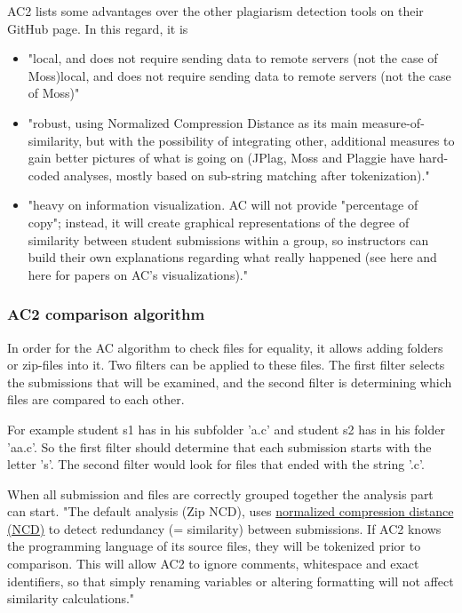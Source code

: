 \documentclass[a4paper, 11pt]{article}
\renewcommand{\\}{\vspace*{0.5\baselineskip} \newline}
\begin{document}
AC2 lists some advantages over the other plagiarism detection tools on their GitHub page. In this regard, it is

\begin{itemize}
	\item "local, and does not require sending data to remote servers (not the case of Moss)local, and does not require sending data to remote servers (not the case of Moss)"
	\item "robust, using Normalized Compression Distance as its main measure-of-similarity, but with the possibility of integrating other, additional measures to gain better pictures of what is going on (JPlag, Moss and Plaggie have hard-coded analyses, mostly based on sub-string matching after tokenization)."
	\item "heavy on information visualization. AC will not provide "percentage of copy"; instead, it will create graphical representations of the degree of similarity between student submissions within a group, so instructors can build their own explanations regarding what really happened (see here and here for papers on AC's visualizations)."
\end{itemize}\autocite{AC2}

\subsubsection{AC2 comparison algorithm}
\label{sec:AC2ComparisonAlgorithm}

In order for the AC algorithm to check files for equality, it allows adding folders or zip-files into it. Two filters can be applied to these files. The first filter selects the submissions that will be examined, and the second filter is determining which files are compared to each other. 

For example student s1 has in his subfolder 'a.c' and student s2 has in his folder 'aa.c'. So the first filter should determine that each submission starts with the letter 's'. The second filter would look for files that ended with the string '.c'.

When all submission and files are correctly grouped together the analysis part can start. "The default analysis (Zip NCD), uses \hyperref[sec:NCD]{normalized compression distance (NCD)} to detect redundancy (= similarity) between submissions. If AC2 knows the programming language of its source files, they will be tokenized prior to comparison. This will allow AC2 to ignore comments, whitespace and exact identifiers, so that simply renaming variables or altering formatting will not affect similarity calculations." \autocite{AC2wiki} 
\end{document}
